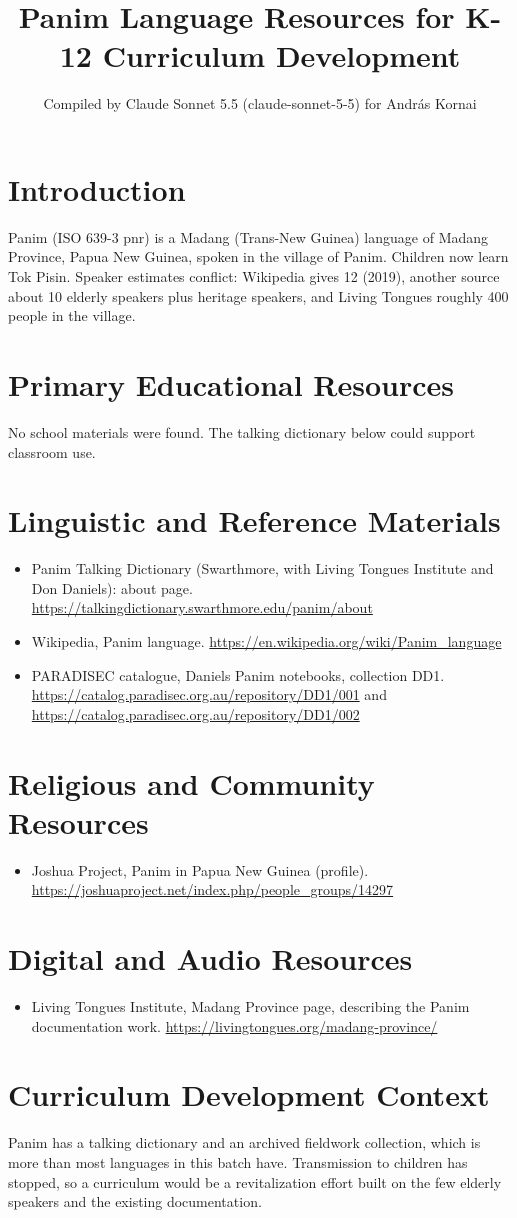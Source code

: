 \documentclass[12pt]{article}
\title{Panim Language Resources for K-12 Curriculum Development}
\author{Compiled by Claude Sonnet 5.5 (claude-sonnet-5-5) for Andr\'as Kornai}
\date{}
\begin{document}
\maketitle
\section{Introduction}
Panim (ISO 639-3 pnr) is a Madang (Trans-New Guinea) language of Madang Province, Papua New Guinea, spoken in the village of Panim. Children now learn Tok Pisin. Speaker estimates conflict: Wikipedia gives 12 (2019), another source about 10 elderly speakers plus heritage speakers, and Living Tongues roughly 400 people in the village.
\section{Primary Educational Resources}
No school materials were found. The talking dictionary below could support classroom use.
\section{Linguistic and Reference Materials}
\begin{itemize}
\item Panim Talking Dictionary (Swarthmore, with Living Tongues Institute and Don Daniels): about page. \url{https://talkingdictionary.swarthmore.edu/panim/about}
\item Wikipedia, Panim language. \url{https://en.wikipedia.org/wiki/Panim_language}
\item PARADISEC catalogue, Daniels Panim notebooks, collection DD1. \url{https://catalog.paradisec.org.au/repository/DD1/001} and \url{https://catalog.paradisec.org.au/repository/DD1/002}
\end{itemize}
\section{Religious and Community Resources}
\begin{itemize}
\item Joshua Project, Panim in Papua New Guinea (profile). \url{https://joshuaproject.net/index.php/people_groups/14297}
\end{itemize}
\section{Digital and Audio Resources}
\begin{itemize}
\item Living Tongues Institute, Madang Province page, describing the Panim documentation work. \url{https://livingtongues.org/madang-province/}
\end{itemize}
\section{Curriculum Development Context}
Panim has a talking dictionary and an archived fieldwork collection, which is more than most languages in this batch have. Transmission to children has stopped, so a curriculum would be a revitalization effort built on the few elderly speakers and the existing documentation.
\end{document}
